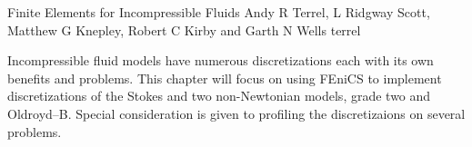               {Finite Elements for Incompressible Fluids}
              {Andy R Terrel, L Ridgway Scott, Matthew G Knepley, Robert C Kirby and Garth N Wells}
              {terrel}

Incompressible fluid models have numerous discretizations each with
its own benefits and problems. This chapter will focus on using FEniCS
to implement discretizations of the Stokes and two non-Newtonian
models, grade two and Oldroyd--B. Special consideration is given to
profiling the discretizaions on several problems.
